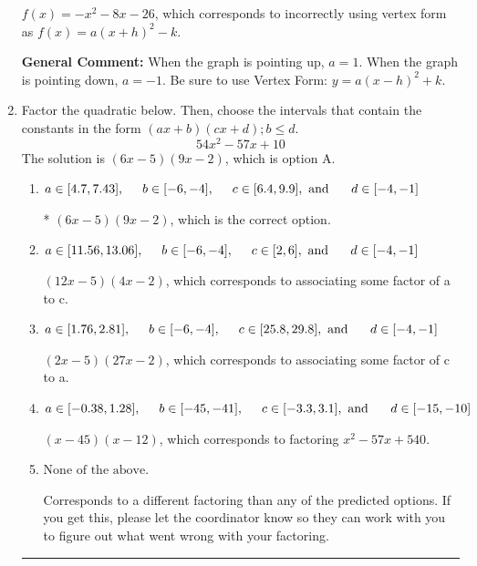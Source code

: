 \documentclass{extbook}[14pt]
\newcommand{\litem}[1]{\item #1

\rule{\textwidth}{0.4pt}}
\begin{document}
\begin{enumerate}
{\begin{enumerate}[label=\Alph*.]
$f(x)=-x^{2} -8 x -26$, which corresponds to incorrectly using vertex form as $f(x) = a(x+h)^2 - k$.
\end{enumerate}

\textbf{General Comment:} When the graph is pointing up, $a=1$. When the graph is pointing down, $a=-1$. Be sure to use Vertex Form: $y = a(x-h)^2+k$.
}
\litem{
Factor the quadratic below. Then, choose the intervals that contain the constants in the form $(ax+b)(cx+d); b \leq d.$
\[ 54x^{2} -57 x + 10 \]The solution is \( (6x -5)(9x -2) \), which is option A.\begin{enumerate}[label=\Alph*.]
\item \( a \in [4.7, 7.43], \hspace*{5mm} b \in [-6, -4], \hspace*{5mm} c \in [6.4, 9.9], \text{ and } \hspace*{5mm} d \in [-4, -1] \)

* $(6x -5)(9x -2)$, which is the correct option.
\item \( a \in [11.56, 13.06], \hspace*{5mm} b \in [-6, -4], \hspace*{5mm} c \in [2, 6], \text{ and } \hspace*{5mm} d \in [-4, -1] \)

 $(12x -5)(4x -2)$, which corresponds to associating some factor of a to c.
\item \( a \in [1.76, 2.81], \hspace*{5mm} b \in [-6, -4], \hspace*{5mm} c \in [25.8, 29.8], \text{ and } \hspace*{5mm} d \in [-4, -1] \)

 $(2x -5)(27x -2)$, which corresponds to associating some factor of c to a.
\item \( a \in [-0.38, 1.28], \hspace*{5mm} b \in [-45, -41], \hspace*{5mm} c \in [-3.3, 3.1], \text{ and } \hspace*{5mm} d \in [-15, -10] \)

 $(x -45)(x -12)$, which corresponds to factoring $x^{2} -57 x + 540$.
\item \( \text{None of the above.} \)

 Corresponds to a different factoring than any of the predicted options. If you get this, please let the coordinator know so they can work with you to figure out what went wrong with your factoring.
\end{enumerate}

}
\end{enumerate}
\end{document}
